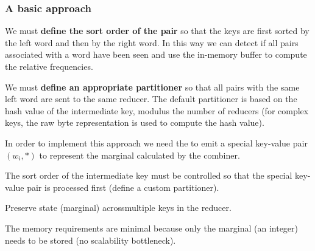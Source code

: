 \subsubsection{A basic approach}
We must \textbf{define the sort order of the pair} so that the keys are first sorted by the left word and then by the right word. In this way we can detect if all pairs associated with a word have been seen and use the in-memory buffer to compute the relative frequencies.
\par
We must \textbf{define an appropriate partitioner} so that all pairs with the same left word are sent to the same reducer. The default partitioner is based on the hash value of the intermediate key, modulus the number of reducers (for complex keys, the raw byte representation is used to compute the hash value).
\newline
\par
In order to implement this approach we need the to emit a special key-value pair $(w_i, *)$ to represent the marginal calculated by the combiner.
\par\noindent
The sort order of the intermediate key must be controlled so that the special key-value pair is processed first (define a custom partitioner).
\par\noindent
Preserve state (marginal) acrossmultiple keys in the reducer.
\par
The memory requirements are minimal because only the marginal (an integer) needs to be stored (no scalability bottleneck).
